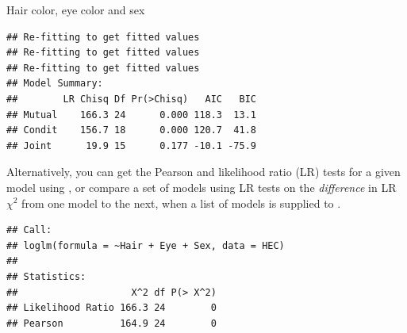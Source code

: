 \documentclass[11pt]{book}
\renewenvironment{knitrout}{\small\renewcommand{\baselinestretch}{.85}}{} %
\begin{document}
\begin{Example}[HEC2]{Hair color, eye color and sex}
\begin{knitrout}
\color{fgcolor}\begin{kframe}
\begin{alltt}
 \hlkwb{<-} \hlstd{(}\hlopt{~}  \hlopt{+}  \hlopt{+}       
 \hlkwb{<-} \hlstd{(}\hlopt{~} \hlopt{*} \hlopt{+} \hlopt{*}    
 \hlkwb{<-} \hlstd{(}\hlopt{~} \hlopt{*} \hlopt{+}         
\hlstd{(}\hlstd{(}  
\end{alltt}
\begin{verbatim}
## Re-fitting to get fitted values
## Re-fitting to get fitted values
## Re-fitting to get fitted values
## Model Summary:
##        LR Chisq Df Pr(>Chisq)   AIC   BIC
## Mutual    166.3 24      0.000 118.3  13.1
## Condit    156.7 18      0.000 120.7  41.8
## Joint      19.9 15      0.177 -10.1 -75.9
\end{verbatim}
\end{kframe}
\end{knitrout}
Alternatively, you can get the Pearson and likelihood ratio (LR) tests
for a given model using ,
or compare a set of models using LR tests on the \emph{difference} in
LR $\chi^2$ from one model to the next, when a list of models is supplied
to .
\begin{knitrout}
\color{fgcolor}\begin{kframe}
\begin{alltt}
\end{alltt}
\begin{verbatim}
## Call:
## loglm(formula = ~Hair + Eye + Sex, data = HEC)
## 
## Statistics:
##                    X^2 df P(> X^2)
## Likelihood Ratio 166.3 24        0
## Pearson          164.9 24        0
\end{verbatim}
\begin{alltt}
 \hlstd{=}\hlstd{)}
\end{alltt}

\end{kframe}
\end{knitrout}
\end{Example}
\end{document}
